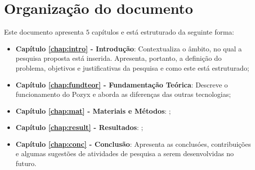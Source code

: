 \section{Organização do documento}
\label{section:organizacao}

Este documento apresenta $5$ capítulos e está estruturado da seguinte forma:

\begin{itemize}

\item \textbf{Capítulo \ref{chap:intro} - Introdução}: Contextualiza o âmbito, no qual a pesquisa proposta está inserida. Apresenta, portanto, a definição do problema, objetivos e justificativas da pesquisa e como este \thetypeworkthree está estruturado;
\item \textbf{Capítulo \ref{chap:fundteor} - Fundamentação Teórica}: Descreve o funcionamento do Pozyx e aborda as diferenças das outras tecnologias;
\item \textbf{Capítulo \ref{chap:mat} - Materiais e Métodos}: ;
\item \textbf{Capítulo \ref{chap:result} - Resultados}: ;
\item \textbf{Capítulo \ref{chap:conc} - Conclusão}: Apresenta as conclusóes, contribuições e algumas sugestões de atividades de pesquisa a serem desenvolvidas no futuro.

\end{itemize}

